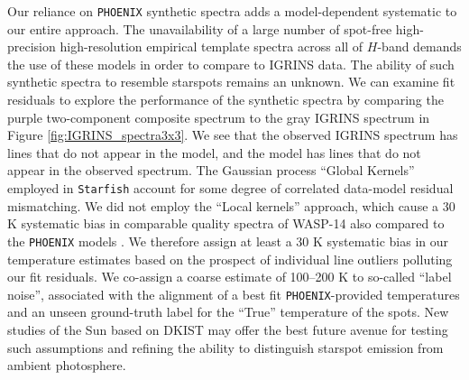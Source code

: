 \documentclass[trackchanges]{aastex631}
\begin{document}
Our reliance on \texttt{PHOENIX} synthetic spectra adds a model-dependent systematic to our entire approach.  The unavailability of a large number of spot-free high-precision high-resolution empirical template spectra across all of $H$-band demands the use of these models in order to compare to IGRINS data.  The ability of such synthetic spectra to resemble starspots remains an unknown.  We can examine fit residuals to explore the performance of the synthetic spectra by comparing the purple two-component composite spectrum to the gray IGRINS spectrum in Figure \ref{fig:IGRINS_spectra3x3}. We see that the observed IGRINS spectrum has lines that do not appear in the model, and the model has lines that do not appear in the observed spectrum. The Gaussian process ``Global Kernels'' employed in \texttt{Starfish} account for some degree of correlated data-model residual mismatching.  We did not employ the ``Local kernels'' approach, which cause a 30 K systematic bias in comparable quality spectra of WASP-14 also compared to the \texttt{PHOENIX} models \citet{czekala15}.  We therefore assign at least a 30 K systematic bias in our temperature estimates based on the prospect of individual line outliers polluting our fit residuals.  We co-assign a coarse estimate of 100--200 K to so-called ``label noise'', associated with the alignment of a best fit \texttt{PHOENIX}-provided temperatures and an unseen ground-truth label for the ``True'' temperature of the spots. New studies of the Sun based on DKIST may offer the best future avenue for testing such assumptions and refining the ability to distinguish starspot emission from ambient photosphere.



\end{document}
